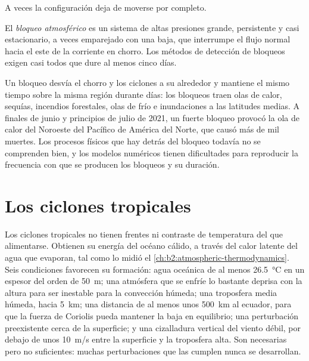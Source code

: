 A veces la configuración deja de moverse por completo.

\begin{definition}\label{def:b2:weather-systems:blocking}
El \emph{bloqueo atmosférico} es un sistema de altas presiones grande, persistente y casi
estacionario, a veces emparejado con una baja, que interrumpe el flujo normal hacia el este
de la corriente en chorro. Los métodos de detección de bloqueos exigen casi todos que dure al menos cinco
días.
\end{definition}

Un bloqueo desvía el chorro y los ciclones a su alrededor y mantiene el mismo tiempo sobre la misma
región durante días: los bloqueos traen olas de calor, sequías, incendios forestales, olas de frío e inundaciones a las
latitudes medias. A finales de junio y principios de julio de 2021, un fuerte bloqueo provocó la ola de calor del
Noroeste del Pacífico de América del Norte, que causó más de mil muertes. Los procesos físicos
que hay detrás del bloqueo todavía no se comprenden bien, y los modelos numéricos tienen dificultades para
reproducir la frecuencia con que se producen los bloqueos y su duración.

\section{Los ciclones tropicales}\label{sec:b2:weather-systems:tropical}

Los ciclones tropicales no tienen frentes ni contraste de temperatura del que alimentarse. Obtienen su energía
del océano cálido, a través del calor latente del agua que evaporan, tal como lo midió el \cref{ch:b2:atmospheric-thermodynamics}.
Seis condiciones favorecen su formación: agua oceánica de al menos \qty{26.5}{\celsius}
en un espesor del orden de \qty{50}{m}; una atmósfera que se enfríe lo bastante deprisa con la altura para
ser inestable para la convección húmeda; una troposfera media húmeda, hacia \qty{5}{km}; una distancia de
al menos unos \qty{500}{km} al ecuador, para que la fuerza de Coriolis pueda mantener la baja en
equilibrio; una perturbación preexistente cerca de la superficie; y una cizalladura vertical del viento débil, por debajo de unos
\qty{10}{m/s} entre la superficie y la troposfera alta. Son necesarias pero no
suficientes: muchas perturbaciones que las cumplen nunca se desarrollan.

